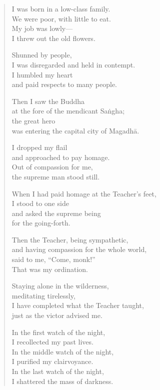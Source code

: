\documentclass[12pt,openany]{book}%
\begin{document}
\begin{verse}%
I was born in a low-class family. \\
We were poor, with little to eat. \\
My job was lowly—\\
I threw out the old flowers. 

Shunned by people, \\
I was disregarded and held in contempt. \\
I humbled my heart \\
and paid respects to many people. 

Then I saw the Buddha \\
at the fore of the mendicant \textsanskrit{Saṅgha}; \\
the great hero \\
was entering the capital city of \textsanskrit{Magadhā}. 

I dropped my flail \\
and approached to pay homage. \\
Out of compassion for me, \\
the supreme man stood still. 

When I had paid homage at the Teacher’s feet, \\
I stood to one side \\
and asked the supreme being \\
for the going-forth. 

Then the Teacher, being sympathetic, \\
and having compassion for the whole world, \\
said to me, “Come, monk!” \\
That was my ordination. 

Staying alone in the wilderness, \\
meditating tirelessly, \\
I have completed what the Teacher taught, \\
just as the victor advised me. 

In the first watch of the night, \\
I recollected my past lives. \\
In the middle watch of the night, \\
I purified my clairvoyance. \\
In the last watch of the night, \\
I shattered the mass of darkness. 


\end{verse}
\end{document}
